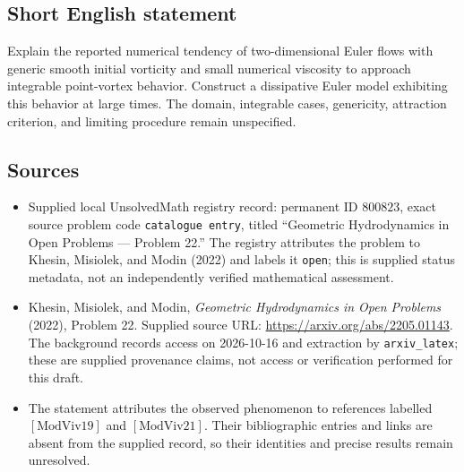 \documentclass[11pt]{article}
\begin{document}
\subsection{Short English statement}
Explain the reported numerical tendency of two-dimensional Euler flows with generic smooth initial vorticity and small numerical viscosity to approach integrable point-vortex behavior. Construct a dissipative Euler model exhibiting this behavior at large times. The domain, integrable cases, genericity, attraction criterion, and limiting procedure remain unspecified.
\subsection{Sources}
\begin{itemize}
\item Supplied local UnsolvedMath registry record: permanent ID \(800823\), exact source problem code \texttt{catalogue entry}, titled ``Geometric Hydrodynamics in Open Problems --- Problem 22.'' The registry attributes the problem to Khesin, Misiolek, and Modin (2022) and labels it \texttt{open}; this is supplied status metadata, not an independently verified mathematical assessment.
\item Khesin, Misiolek, and Modin, \emph{Geometric Hydrodynamics in Open Problems} (2022), Problem 22. Supplied source URL: \url{https://arxiv.org/abs/2205.01143}. The background records access on 2026-10-16 and extraction by \texttt{arxiv\_latex}; these are supplied provenance claims, not access or verification performed for this draft.
\item The statement attributes the observed phenomenon to references labelled \([\mathrm{ModViv19}]\) and \([\mathrm{ModViv21}]\). Their bibliographic entries and links are absent from the supplied record, so their identities and precise results remain unresolved.
\end{itemize}
\end{document}
